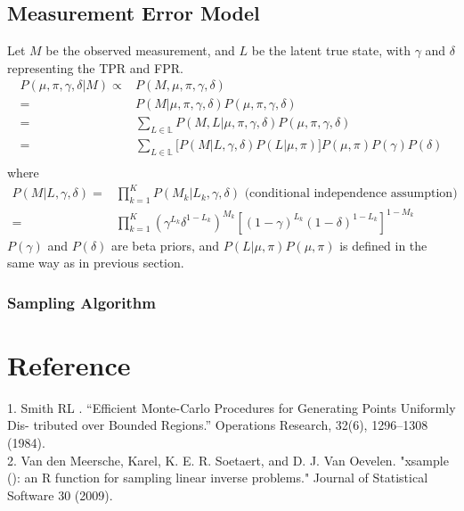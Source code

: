 \documentclass[11 pt, a4paper]{article}  %
\begin{document}
\newpage
\subsection{Measurement Error Model}
Let $M$ be the observed measurement, and $L$ be the latent true state, with $\gamma$ and $\delta$ representing the TPR and FPR.
\begin{align*}
P(\mu, \pi , \gamma, \delta|M) \propto & P(M, \mu, \pi, \gamma, \delta) \\
= & P(M | \mu, \pi, \gamma, \delta) P(\mu, \pi, \gamma, \delta) \\
= & \sum_{L \in \mathbb{L}}  P(M, L | \mu, \pi, \gamma, \delta) P(\mu, \pi, \gamma, \delta) \\ 
= & \sum_{L \in \mathbb{L}} \big[ P(M | L, \gamma, \delta) P(L | \mu, \pi) \big ] P(\mu, \pi) P(\gamma) P(\delta) \\ 
\end{align*}
where 
\begin{align*}
 P(M | L, \gamma, \delta) = & \prod_{k=1}^K P(M_k | L_k, \gamma, \delta) \text{\ \ (conditional independence assumption)}\\
 = & \prod_{k=1}^K (\gamma^{L_k} \delta^{1-L_k})^{M_k} [(1-\gamma)^{L_k} (1-\delta)^{1-L_k}]^{1-M_k}
\end{align*}
$P(\gamma)$ and $ P(\delta)$ are beta priors, and $P(L | \mu, \pi)  P(\mu, \pi)$ is defined in the same way as in previous section.


\subsubsection{Sampling Algorithm}

%





\newpage
\section*{Reference}
1. Smith RL . “Efficient Monte-Carlo Procedures for Generating Points Uniformly Dis- tributed over Bounded Regions.” Operations Research, 32(6), 1296–1308 (1984).\\ 
2. Van den Meersche, Karel, K. E. R. Soetaert, and D. J. Van Oevelen. "xsample (): an R function for sampling linear inverse problems." Journal of Statistical Software 30 (2009).
\end{document}
